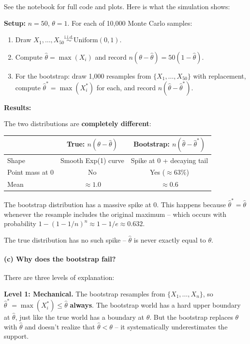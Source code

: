 \documentclass[11pt]{article}
\begin{document}
See the notebook for full code and plots. Here is what the simulation shows:

\textbf{Setup:} $n = 50$, $\theta = 1$. For each of 10,000 Monte Carlo samples:
\begin{enumerate}
  \item Draw $X_1, \ldots, X_{50} \overset{\text{i.i.d.}}{\sim} \text{Uniform}(0, 1)$.
  \item Compute $\hat{\theta} = \max(X_i)$ and record $n(\theta - \hat{\theta}) = 50(1 - \hat{\theta})$.
  \item For the bootstrap: draw 1,000 resamples from $\{X_1, \ldots, X_{50}\}$ with replacement, compute $\hat{\theta}^* = \max(X_i^*)$ for each, and record $n(\hat{\theta} - \hat{\theta}^*)$.
\end{enumerate}

\textbf{Results:}

The two distributions are \textbf{completely different}:

\begin{center}
\begin{tabular}{@{}lcc@{}}
\toprule
& \textbf{True: $n(\theta - \hat{\theta})$} & \textbf{Bootstrap: $n(\hat{\theta} - \hat{\theta}^*)$} \\
\midrule
Shape & Smooth Exp(1) curve & Spike at 0 + decaying tail \\
Point mass at 0 & No & Yes ($\approx 63\%$) \\
Mean & $\approx 1.0$ & $\approx 0.6$ \\
\bottomrule
\end{tabular}
\end{center}

The bootstrap distribution has a massive spike at 0. This happens because $\hat{\theta}^* = \hat{\theta}$ whenever the resample includes the original maximum -- which occurs with probability $1 - (1 - 1/n)^n \approx 1 - 1/e \approx 0.632$.

The true distribution has no such spike -- $\hat{\theta}$ is never exactly equal to $\theta$.

\paragraph{(c) Why does the bootstrap fail?}

There are three levels of explanation:

\textbf{Level 1: Mechanical.} The bootstrap resamples from $\{X_1, \ldots, X_n\}$, so $\hat{\theta}^* = \max(X_i^*) \leq \hat{\theta}$ \textbf{always}. The bootstrap world has a hard upper boundary at $\hat{\theta}$, just like the true world has a boundary at $\theta$. But the bootstrap replaces $\theta$ with $\hat{\theta}$ and doesn't realize that $\hat{\theta} < \theta$ -- it systematically underestimates the support.
\end{document}
